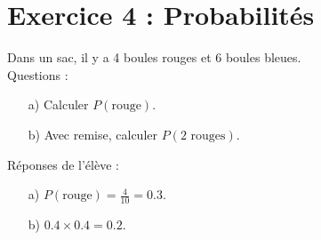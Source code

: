 \documentclass{article}
\begin{document}
\section*{Exercice 4 : Probabilités}
Dans un sac, il y a 4 boules rouges et 6 boules bleues. \\
Questions :
\begin{enumerate}
    \item[a)] Calculer $P(\text{rouge})$.
    \item[b)] Avec remise, calculer $P(2 \text{ rouges})$.
\end{enumerate}
Réponses de l’élève :
\begin{enumerate}
    \item[a)] $P(\text{rouge}) = \frac{4}{10} = 0.3$.
    \item[b)] $0.4 \times 0.4 = 0.2$.
\end{enumerate}
\end{document}
